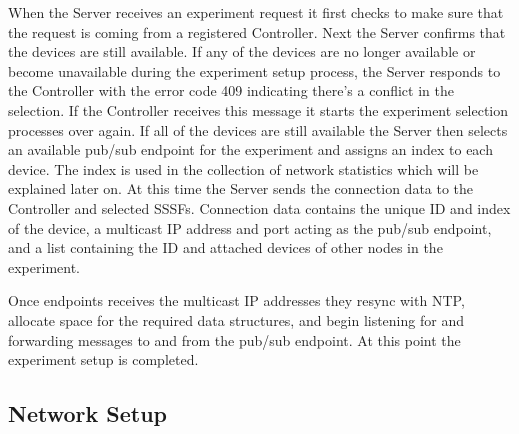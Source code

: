 \documentclass[letterpaper,twocolumn,10pt]{article}
\begin{document}
When the Server receives an experiment request it first checks to make sure that the request is coming from a registered Controller. Next the Server confirms that the devices are still available. If any of the devices are no longer available or become unavailable during the experiment setup process, the Server responds to the Controller with the error code 409 indicating there's a conflict in the selection. If the Controller receives this message it starts the experiment selection processes over again. If all of the devices are still available the Server then selects an available pub/sub endpoint for the experiment and assigns an index to each device. The index is used in the collection of network statistics which will be explained later on. At this time the Server sends the connection data to the Controller and selected SSSFs. Connection data contains the unique ID and index of the device, a multicast IP address and port acting as the pub/sub endpoint, and a list containing the ID and attached devices of other nodes in the experiment.

Once endpoints receives the multicast IP addresses they resync with NTP, allocate space for the required data structures, and begin listening for and forwarding messages to and from the pub/sub endpoint. At this point the experiment setup is completed.

\subsection{Network Setup}
\end{document}
